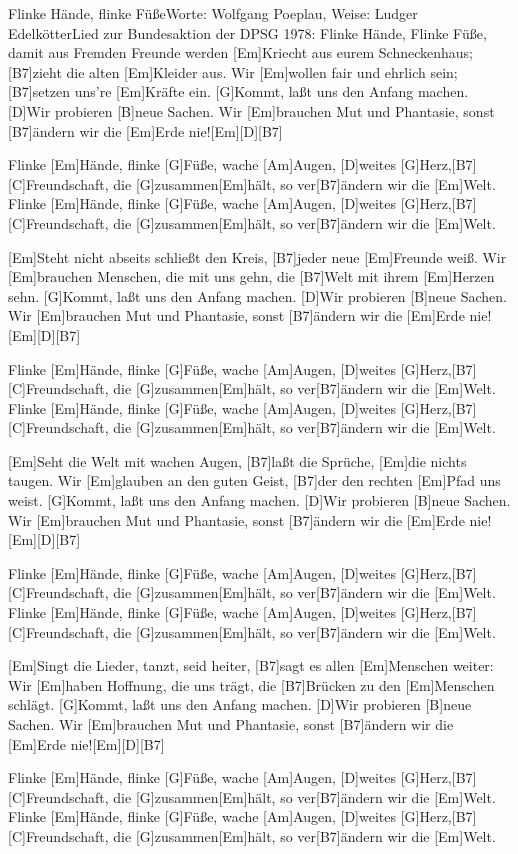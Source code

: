 \documentclass[../main.tex]{subfiles}
\begin{document}
\begin{song}[2]{Flinke Hände, flinke Füße}{Worte: Wolfgang Poeplau, Weise: Ludger Edelkötter}{Lied zur Bundesaktion der DPSG 1978: \glqq{}Flinke Hände, Flinke Füße, damit aus Fremden Freunde werden\grqq{}}
[Em]Kriecht aus eurem Schneckenhaus;  [B7]zieht die alten [Em]Kleider aus.
Wir [Em]wollen fair und ehrlich sein; [B7]setzen uns're   [Em]Kräfte ein.
[G]Kommt, laßt uns den Anfang machen. [D]Wir probieren [B]neue Sachen.
Wir [Em]brauchen Mut und Phantasie, sonst [B7]{ä}ndern wir die [Em]Erde nie![Em]{\hh}[D]{\hh}[B7]{\hh}

Flinke [Em]Hände, flinke [G]Füße, wache [Am]Augen, [D]weites [G]Herz,[B7]{\hh}
[C]Freundschaft, die [G]zusammen[Em]hält, so ver[B7]{ä}ndern wir die [Em]Welt.
Flinke [Em]Hände, flinke [G]Füße, wache [Am]Augen, [D]weites [G]Herz,[B7]{\hh}
[C]Freundschaft, die [G]zusammen[Em]hält, so ver[B7]{ä}ndern wir die [Em]Welt.

[Em]Steht nicht abseits schließt den Kreis,      [B7]jeder neue     [Em]Freunde weiß.
Wir [Em]brauchen Menschen, die mit uns gehn, die [B7]Welt mit ihrem [Em]Herzen sehn.
[G]Kommt, laßt uns den Anfang machen. [D]Wir probieren [B]neue Sachen.
Wir [Em]brauchen Mut und Phantasie, sonst [B7]{ä}ndern wir die [Em]Erde nie![Em]{\hh}[D]{\hh}[B7]{\hh}

Flinke [Em]Hände, flinke [G]Füße, wache [Am]Augen, [D]weites [G]Herz,[B7]{\hh}
[C]Freundschaft, die [G]zusammen[Em]hält, so ver[B7]{ä}ndern wir die [Em]Welt.
Flinke [Em]Hände, flinke [G]Füße, wache [Am]Augen, [D]weites [G]Herz,[B7]{\hh}
[C]Freundschaft, die [G]zusammen[Em]hält, so ver[B7]{ä}ndern wir die [Em]Welt.

[Em]Seht die Welt mit wachen Augen, [B7]laßt die Sprüche, [Em]die nichts taugen.
Wir [Em]glauben an den guten Geist, [B7]der den rechten   [Em]Pfad uns weist.
[G]Kommt, laßt uns den Anfang machen. [D]Wir probieren [B]neue Sachen.
Wir [Em]brauchen Mut und Phantasie, sonst [B7]{ä}ndern wir die [Em]Erde nie![Em]{\hh}[D]{\hh}[B7]{\hh}

Flinke [Em]Hände, flinke [G]Füße, wache [Am]Augen, [D]weites [G]Herz,[B7]{\hh}
[C]Freundschaft, die [G]zusammen[Em]hält, so ver[B7]{ä}ndern wir die [Em]Welt.
Flinke [Em]Hände, flinke [G]Füße, wache [Am]Augen, [D]weites [G]Herz,[B7]{\hh}
[C]Freundschaft, die [G]zusammen[Em]hält, so ver[B7]{ä}ndern wir die [Em]Welt.

[Em]Singt die Lieder, tanzt, seid heiter,  [B7]sagt es allen  [Em]Menschen weiter:
Wir [Em]haben Hoffnung, die uns trägt, die [B7]Brücken zu den [Em]Menschen schlägt.
[G]Kommt, laßt uns den Anfang machen. [D]Wir probieren [B]neue Sachen.
Wir [Em]brauchen Mut und Phantasie, sonst [B7]{ä}ndern wir die [Em]Erde nie![Em]{\hh}[D]{\hh}[B7]{\hh}

Flinke [Em]Hände, flinke [G]Füße, wache [Am]Augen, [D]weites [G]Herz,[B7]{\hh}
[C]Freundschaft, die [G]zusammen[Em]hält, so ver[B7]{ä}ndern wir die [Em]Welt.
Flinke [Em]Hände, flinke [G]Füße, wache [Am]Augen, [D]weites [G]Herz,[B7]{\hh}
[C]Freundschaft, die [G]zusammen[Em]hält, so ver[B7]{ä}ndern wir die [Em]Welt.

\end{song}
\end{document}
